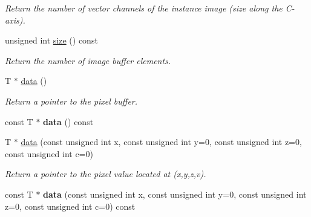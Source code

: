\begin{DoxyCompactItemize}
\begin{DoxyCompactList}\small\item\em Return the number of vector channels of the instance image (size along the C-\/axis). \item\end{DoxyCompactList}\item 
unsigned int \hyperlink{structcimg__library_1_1CImg_a90ca964ebcc1b02bbcde225edd49e812}{size} () const 
\begin{DoxyCompactList}\small\item\em Return the number of image buffer elements. \item\end{DoxyCompactList}\item 
\hypertarget{structcimg__library_1_1CImg_a1699472936b80a88d3fc8096975d21b2}{
T $\ast$ \hyperlink{structcimg__library_1_1CImg_a1699472936b80a88d3fc8096975d21b2}{data} ()}
\label{structcimg__library_1_1CImg_a1699472936b80a88d3fc8096975d21b2}

\begin{DoxyCompactList}\small\item\em Return a pointer to the pixel buffer. \item\end{DoxyCompactList}\item 
\hypertarget{structcimg__library_1_1CImg_a92597b6ad54c8cebd6a987b7762eecfc}{
const T $\ast$ {\bfseries data} () const }
\label{structcimg__library_1_1CImg_a92597b6ad54c8cebd6a987b7762eecfc}

\item 
T $\ast$ \hyperlink{structcimg__library_1_1CImg_a567d0f7b9c743a42958cfce84f8d432f}{data} (const unsigned int x, const unsigned int y=0, const unsigned int z=0, const unsigned int c=0)
\begin{DoxyCompactList}\small\item\em Return a pointer to the pixel value located at ({\ttfamily x},{\ttfamily y},{\ttfamily z},{\ttfamily v}). \item\end{DoxyCompactList}\item 
\hypertarget{structcimg__library_1_1CImg_a1f072e9c860d0ce6798641d8a7140837}{
const T $\ast$ {\bfseries data} (const unsigned int x, const unsigned int y=0, const unsigned int z=0, const unsigned int c=0) const }
\label{structcimg__library_1_1CImg_a1f072e9c860d0ce6798641d8a7140837}


\end{DoxyCompactItemize}
